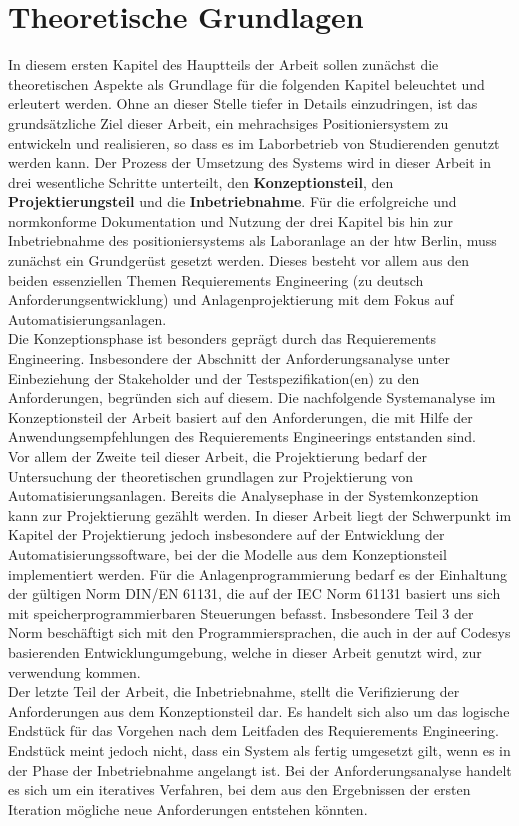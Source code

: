 \documentclass[../Bachelorarbeit.tex]{subfiles}
\begin{document}
\section{Theoretische Grundlagen}
In diesem ersten Kapitel des Hauptteils der Arbeit sollen zunächst die theoretischen Aspekte als Grundlage für die folgenden Kapitel beleuchtet und erleutert werden. Ohne an dieser Stelle tiefer in Details einzudringen, ist das grundsätzliche Ziel dieser Arbeit, ein mehrachsiges Positioniersystem zu entwickeln und realisieren, so dass es im Laborbetrieb von Studierenden genutzt werden kann. Der Prozess der Umsetzung des Systems wird in dieser Arbeit in drei wesentliche Schritte unterteilt, den \textbf{Konzeptionsteil}, den \textbf{Projektierungsteil} und die \textbf{Inbetriebnahme}. Für die erfolgreiche und normkonforme Dokumentation und Nutzung der drei Kapitel bis hin zur Inbetriebnahme des positioniersystems als Laboranlage an der \ac{htw} Berlin, muss zunächst ein Grundgerüst gesetzt werden. Dieses besteht vor allem aus den beiden essenziellen Themen Requierements Engineering (zu deutsch Anforderungsentwicklung) und Anlagenprojektierung mit dem Fokus auf Automatisierungsanlagen.\\
Die Konzeptionsphase ist besonders geprägt durch das Requierements Engineering. Insbesondere der Abschnitt der Anforderungsanalyse unter Einbeziehung der Stakeholder und der Testspezifikation(en) zu den Anforderungen, begründen sich auf diesem. Die nachfolgende Systemanalyse im Konzeptionsteil der Arbeit basiert auf den Anforderungen, die mit Hilfe der Anwendungsempfehlungen des Requierements Engineerings entstanden sind.\\
Vor allem der Zweite teil dieser Arbeit, die Projektierung bedarf der Untersuchung der theoretischen grundlagen zur Projektierung von Automatisierungsanlagen. Bereits die Analysephase in der Systemkonzeption kann zur Projektierung gezählt werden. In dieser Arbeit liegt der Schwerpunkt im Kapitel der Projektierung jedoch insbesondere auf der Entwicklung der Automatisierungssoftware, bei der die Modelle aus dem Konzeptionsteil implementiert werden. Für die Anlagenprogrammierung bedarf es der Einhaltung der gültigen Norm DIN/EN 61131, die auf der IEC Norm 61131 basiert uns sich mit speicherprogrammierbaren Steuerungen befasst. Insbesondere Teil 3 der Norm beschäftigt sich mit den Programmiersprachen, die auch in der auf Codesys basierenden Entwicklungumgebung, welche in dieser Arbeit genutzt wird, zur verwendung kommen. \\
Der letzte Teil der Arbeit, die Inbetriebnahme, stellt die Verifizierung der Anforderungen aus dem Konzeptionsteil dar. Es handelt sich also um das logische Endstück für das Vorgehen nach dem Leitfaden des Requierements Engineering. Endstück meint jedoch nicht, dass ein System als fertig umgesetzt gilt, wenn es in der Phase der Inbetriebnahme angelangt ist. Bei der Anforderungsanalyse handelt es sich um ein iteratives Verfahren, bei dem aus den Ergebnissen der ersten Iteration mögliche neue Anforderungen entstehen könnten.\\
\end{document}
